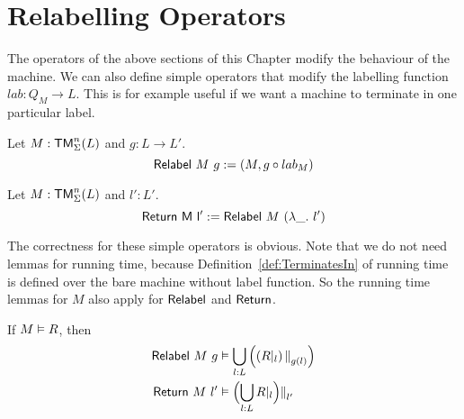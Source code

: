 \section{Relabelling Operators}
\label{sec:labelling-op}
%

The operators of the above sections of this Chapter modify the behaviour of the machine.  We can also define simple operators that modify the
labelling function $lab : Q_M \to L$.  This is for example useful if we want a machine to terminate in one particular label.

\begin{definition}[$\MS{Relabel}$][Relabel]
  Let $M:\mathsf{TM}_\Sigma^n(L)$ and $g : L \to L'$.
  \[
    \mathsf{Relabel}~M~g := \left(M, g \circ lab_M\right)
  \]
\end{definition}

\begin{definition}[$\MS{Return}$][Return]
  Let $M:\mathsf{TM}_\Sigma^n(L)$ and $l':L'$.
  \[
    \mathsf{Return~M~l'} := \mathsf{Relabel}~M~(\lambda \_.~l')
  \]
\end{definition}

The correctness for these simple operators is obvious.  Note that we do not need lemmas for running time, because Definition~\ref{def:TerminatesIn} of
running time is defined over the bare machine without label function.  So the running time lemmas for $M$ also apply for $\MS{Relabel}$
and $\MS{Return}$.
\begin{lemma}
  If $M \mathrel{\vDash} R$, then
  \begin{alignat*}{1}
    \mathsf{Relabel}~M~g & \mathrel{\vDash} \bigcup_{l:L} \left( \left(R {|}_{l}\right) {|\mkern-1.5mu|}_{g(l)} \right) \\
    \mathsf{Return}~M~l'         & \mathrel{\vDash} \Bigl( \bigcup_{l:L} R {|}_{l} \Bigr) {|\mkern-1.5mu|}_{l'}
  \end{alignat*}
\end{lemma}


